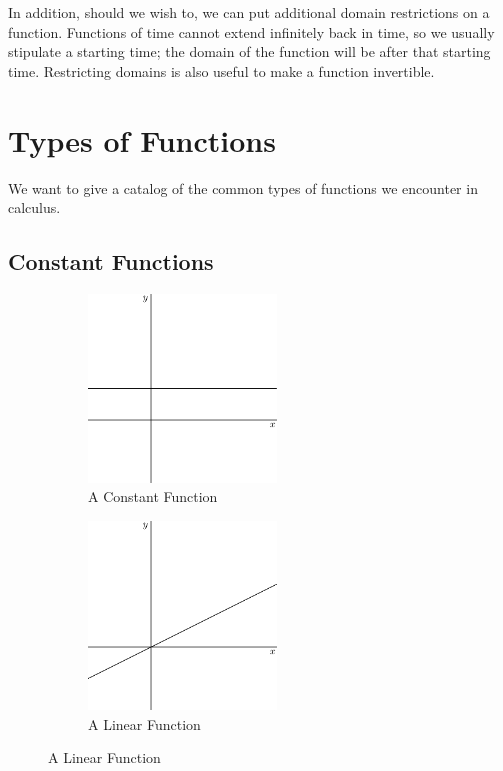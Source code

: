 \documentclass[fleqn]{report}
\begin{document}
In addition, should we wish to, we can put additional domain
restrictions on a function. Functions of time cannot extend
infinitely back in time, so we usually stipulate a starting
time; the domain of the function will be after that starting
time. Restricting domains is also useful to make a function
invertible.

\section{Types of Functions}
\label{types-of-functions}

We want to give a catalog of the common types of functions we
encounter in calculus.

\subsection{Constant Functions}
\label{constant-functions}

\begin{figure}[t]
\centering
\begin{subfigure}{.5\textwidth}
 \centering
 \includegraphics[width=5cm]{figure26.eps}
 \caption{A Constant Function}
\end{subfigure}%
\begin{subfigure}{.5\textwidth}
 \centering
 \includegraphics[width=5cm]{figure27.eps}
 \caption{A Linear Function}
\end{subfigure}
\label{figure-types-of-functions1}
\end{figure}
\end{document}
